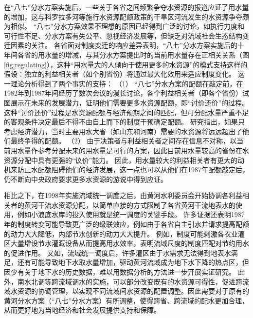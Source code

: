在``八七''分水方案实施后，一些关于各省之间频繁争夺水资源的报道应证了用水量的增加，这与科罗拉多河等施行水资源配额政策的干旱区河流发生的水资源争夺颇为相似\cite{grafton2013, schmandt2021a}。
``八七''分水方案效果不理想的原因已经得到广泛的讨论，如执行力度和可行性不足、分水方案有失公平、忽视经济发展等，但缺乏对流域社会\textendash{}生态结构变迁因素的关注\cite{wang2019b,wang2019a}。
各省面对制度变迁的响应差异表明，``八七''分水方案实施后的十年间各省的用水量的增减，与其分水方案提出时的当前用水量存在正相关关系（图\ref{fig:regulating}），这种“用水量大的人倾向于使用更多的水资源”的模式支持这样的假设：独立的利益相关者（如个别省份）将通过最大化效用来适应制度变化。
这一理论分析得到了两个事实的支持：
（1） ``八七''分水方案的配额在敲定前，在1982年到1987年间经历了数次会议的漫长讨论，各个利益相关者（即各个省份）试图展示在未来的发展潜力，证明他们需要更多水资源配额，即“讨价还价”的过程\cite{wang2019a, wang2019b}。
这种“讨价还价”过程是水资源配额与经济预期之间的匹配，但可分配水量严重不足的客观条件决定最后不得不由自上而下的制度干预确定配额。
研究指出，如果只考虑经济潜力，当时主要用水大省（如山东和河南）需要的水资源将远远超出了他们最终争得的配额\cite{zuo2020}。
（2） 由于决策者与利益相关者之间存在信息不对称，以当前用水量作参考分配未来的用水量是可行的方案，因此目前用水量较高的省份在水资源分配中具有更强的“议价”能力。
因此，用水量较大的利益相关者有更大的动机来防止水配额阻碍他们的经济发展，这一点也可以从他们在1987年配额敲定后，仍不断向中央政府要求更多水资源的游说中得到应证\cite{wang2019a, wang2019b}。


相比之下，在1998年实施流域统一调度之后，由黄河水利委员会开始协调各利益相关者的黄河干流水资源分配，以简单直接的方式限制了各省黄河干流地表水的使用，例如小浪底水库的投入使用就是统一调度的关键手段。
许多证据还表明1987年的制度转变可能导致更广泛的级联效应，例如由于各省自主引水并请求提高配额的动力大大降低，内部节水创新的动力大大提升。
例如，制度可能刺激各农业灌区大量增设节水灌溉设备从而提高用水效率，表明流域尺度的制度匹配对节约用水的促进作用\cite{krieger1955, ostrom1990}。
又如，流域统一调度后，许多灌区由于水需求无法得到地表水满足，还有可能导致地下水取水量增加，驱动黄河流域成为地下水下降的热点区\cite{sun2022}，但因少有关于地下水的历史数据，难以用数据分析的方法进一步开展实证研究。
此外，南水北调等跨流域调水的实施，可以部分改变既有的水资源可得性，促进跨流域水资源的协调管理，以实现不同流域间水资源的配置调整。因此需要对于原有的黄河分水方案（``八七''分水方案）有所调整，使得跨省、跨流域的配水更加合理，从而更好地为当地经济和社会发展提供支持和保障。


